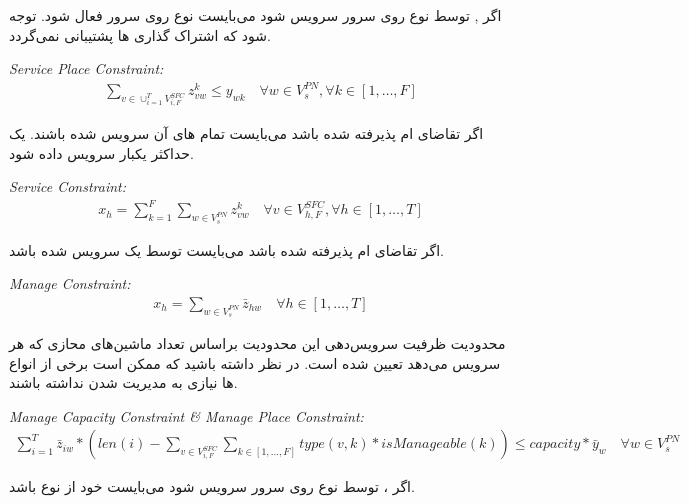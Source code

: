 اگر , 
توسط  نوع 
روی سرور  سرویس شود می‌بایست
 نوع 
روی سرور  فعال شود.
توجه شود که
اشتراک گذاری ها پشتیبانی نمی‌گردد.

\begin{latin}
    \textit{Service Place Constraint:}
    \begin{align}
        \sum_{v \in \cup_{i=1}^T V_{i, F}^{SFC}} z_{vw}^k \le y_{wk}
        \quad
        \forall w \in V_s^{PN}, \forall k \in [1,\ldots, F]
    \end{align}
\end{latin}

اگر تقاضای ام پذیرفته شده باشد
می‌بایست تمام های آن‌
سرویس شده باشند.
یک  حداکثر یکبار سرویس داده شود.

\begin{latin}
    \textit{Service Constraint:}
    \begin{align}
        x_h = \sum_{k=1}^{F} \sum_{w \in V_{s}^{PN}} z_{vw}^{k}
        \quad
        \forall v \in V_{h,F}^{SFC}, \forall h \in [1,\ldots, T]
    \end{align}
\end{latin}

اگر تقاضای ام پذیرفته شده باشد
می‌بایست توسط یک  سرویس شده باشد.

\begin{latin}
    \textit{Manage Constraint:}
    \begin{align}
        x_h = \sum_{w \in V_{s}^{PN}} \bar{z}_{hw}
        \quad
        \forall h \in [1,\ldots, T]
    \end{align}
\end{latin}

محدودیت ظرفیت سرویس‌دهی 
این محدودیت براساس تعداد ماشین‌های محازی که هر
سرویس می‌دهد تعیین شده است.
در نظر داشته باشید که ممکن است برخی از انواع
‌ها
نیازی به مدیریت شدن نداشته باشند.

\begin{latin}
    \textit{Manage Capacity Constraint \& Manage Place Constraint:}
    \begin{align}
        \sum_{i=1}^{T} \bar{z}_{iw} * (len(i) - \sum_{v \in V_{i, F}^{SFC}} \sum_{k \in [1, \dots, F]} type(v, k) * isManageable(k)) \le capacity * \bar{y}_{w}
        \quad
        \forall w \in V_{s}^{PN}
    \end{align}
\end{latin}

اگر ،  توسط
نوع  روی سرور 
سرویس شود می‌بایست خود از نوع  باشد.

